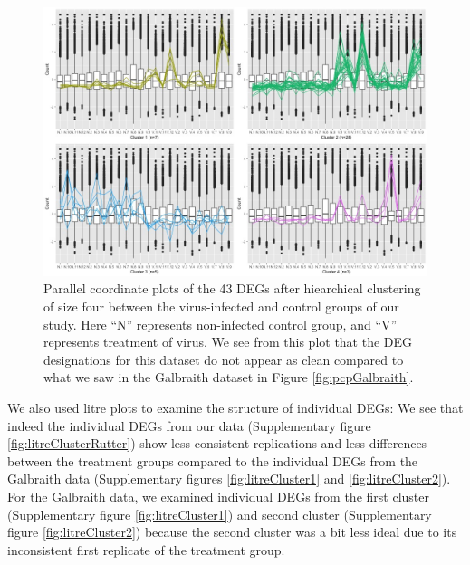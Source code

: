 \documentclass[11pt,a4paper,oldfontcommands,openany]{memoir}
\numberwithin{equation}{section} %
\begin{document}
\begin{figure}[H]
\centering
\begin{framed}
  \includegraphics[width=\textwidth]{Images/N_V_4.jpg}
  \end{framed}
  \caption{Parallel coordinate plots of the 43 DEGs after hiearchical clustering of size four between the virus-infected and control groups of our study. Here ``N'' represents non-infected control group, and ``V'' represents treatment of virus. We see from this plot that the DEG designations for this dataset do not appear as clean compared to what we saw in the Galbraith dataset in Figure \ref{fig:pcpGalbraith}.}
  \label{fig:pcpRutterVirus}
\end{figure}

We also used litre plots to examine the structure of individual DEGs: We see that indeed the individual DEGs from our data (Supplementary figure \ref{fig:litreClusterRutter}) show less consistent replications and less differences between the treatment groups compared to the individual DEGs from the Galbraith data (Supplementary figures \ref{fig:litreCluster1} and \ref{fig:litreCluster2}). For the Galbraith data, we examined individual DEGs from the first cluster (Supplementary figure \ref{fig:litreCluster1}) and second cluster (Supplementary figure \ref{fig:litreCluster2}) because the second cluster was a bit less ideal due to its inconsistent first replicate of the treatment group.
\end{document}
